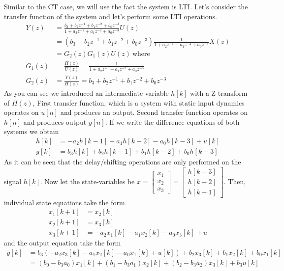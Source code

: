 \documentclass[twoside]{article}
\begin{document}
Similar to the CT case, we will use the fact the system is
LTI. Let's consider the transfer function of the system and let's 
perform some LTI operations.
%
\begin{align*}
Y(z) &= \frac{b_3 + b_2 z^{-1} + b_1 z^{-2} + b_0 z^{-3}}{1+ a_2
       z^{-1} + a_1 z^{-2} + a_0 z^{-3}} U(z)
\\
&= \left( b_3 + b_2 z^{-1} + b_1 z^{-2} + b_0 z^{-3} \right) \frac{1}{1+ a_2
       z^{-1} + a_1 z^{-2} + a_0 z^{-3}} X(z) 
\\
&= G_2(z) G_1(z) U(z) \ \mathrm{where} 
\\
G_1(z) &= \frac{H(z)}{U(z)} = \frac{1}{1+ a_2
       z^{-1} + a_1 z^{-2} + a_0 z^{-3}} 
\\
G_2(z) &= \frac{Y(z)}{H(z)} = b_3 + b_2 z^{-1} + b_1 z^{-2} + b_0 z^{-3} 
\end{align*}
%
As you can see we introduced an intermediate variable $h[k]$ with a
Z-transform of $H(z)$, First transfer function, which is a system
with static input dynamics operates on $u[n]$ and produces an output. 
Second transfer function operates on $h[n]$ and produces output
$y[n]$. If we write the difference equations of both systems we obtain
%
\begin{align*}
h[k] &= -a_2 h[k-1] - a_1 h[k-2] - a_0 h[k-3] + u[k] 
\\
y[k] &= b_3 h[k] + b_2 h[k-1] + b_1 h[k-2] + b_0 h[k-3] 
\end{align*}
%
As it can be seen that the delay/shifting operations are only
performed on the signal $h[k]$. Now let the state-variables be 
$x = \left[ \begin{array}{c} x_1 \\ x_2 \\ x_3 \end{array} \right] 
= \left[ \begin{array}{c} h[k-3] \\ h[k-2] \\ h[k-1]\end{array} \right]$. Then,
individual state equations take the form
%
\begin{align*}
x_1[k+1] &= x_2[k]
\\
x_2[k+1] &= x_3[k]
\\
x_3[k+1] &= -a_2 x_1[k] - a_1 x_2[k] - a_0 x_3[k] + u
\end{align*}
%
and the output equation take the form
%
\begin{align*}
y[k] &= b_3\left( -a_2 x_3[k] - a_1 x_2[k] - a_0 x_1[k] + u[k] \right) + b_2 x_3[k] +
    b_1 x_2[k] + b_0 x_1[k]
\\
&= ( b_0 - b_3 a_0 ) x_1[k] + ( b_1 - b_3 a_1 ) x_2[k] + ( b_2 - b_3 a_2 ) x_3[k] + b_3 u[k]
\end{align*}
\end{document}
